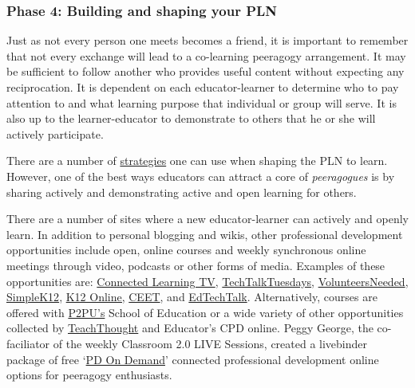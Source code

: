 \subsubsection{Phase 4: Building and shaping your PLN}

Just as not every person one meets becomes a friend, it is important to
remember that not every exchange will lead to a co-learning peeragogy
arrangement. It may be sufficient to follow another who provides useful
content without expecting any reciprocation. It is dependent on each
educator-learner to determine who to pay attention to and what learning
purpose that individual or group will serve. It is also up to the
learner-educator to demonstrate to others that he or she will actively
participate.

There are a number of
\href{http://storify.com/digiphile/how-to-build-a-personal-learning-network-on-twitte}{strategies}
one can use when shaping the PLN to learn. However, one of the best ways
educators can attract a core of \emph{peeragogues} is by sharing
actively and demonstrating active and open learning for others.

There are a number of sites where a new educator-learner can actively
and openly learn. In addition to personal blogging and wikis, other
professional development opportunities include open, online courses and
weekly synchronous online meetings through video, podcasts or other
forms of media. Examples of these opportunities are:
\href{http://connectedlearning.tv/howard-rheingold-social-media-and-peer-learning-mediated-pedagogy-peeragogy}{Connected
Learning TV},
\href{http://techtalktuesdays.global2.vic.edu.au/}{TechTalkTuesdays},
\href{http://learning2gether.pbworks.com/w/page/32206114/volunteersneeded}{VolunteersNeeded},
\href{http://simplek12.com/webinars}{SimpleK12},
\href{http://k12onlineconference.org/}{K12 Online,}
\href{http://www.learnnowbc.ca/educators/moodlemeets/default.aspx}{CEET},
and \href{http://edtechtalk.com/taxonomy/term/130}{EdTechTalk}.
Alternatively, courses are offered with
\href{https://p2pu.org/en/schools/school-of-ed-pilot/}{P2PU's} School of
Education or a wide variety of other opportunities collected by
\href{http://www.teachthought.com/}{TeachThought} and Educator's CPD
online. Peggy George, the co-faciliator of the weekly Classroom 2.0 LIVE
Sessions, created a livebinder package of free
`\href{http://www.google.com/url?q=http\%3A\%2F\%2Fwww.livebinders.com\%2Fplay\%2Fplay\_or\_edit\%3Fid\%3D429095\&sa=D\&sntz=1\&usg=AFQjCNHCIdRn64rPwske2vP7xrpWolb-jA}{PD
On Demand}' connected professional development online options for
peeragogy enthusiasts.


